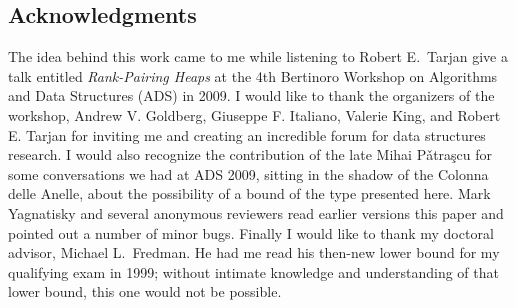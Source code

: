 \begin{fullonly}
\section{Acknowledgments}

The idea behind this work came to me while listening to Robert E.~Tarjan give a talk entitled \emph{Rank-Pairing Heaps} 
at the 4th Bertinoro Workshop on Algorithms and Data Structures (ADS) in 2009. I would like to thank the organizers of the workshop, Andrew V. Goldberg,
Giuseppe F. Italiano,  
Valerie King, and
Robert E. Tarjan for inviting me and creating an incredible forum for data structures research.
I would also recognize the contribution of the late Mihai P\v{a}tra\c{s}cu for some conversations we had at ADS 2009, sitting in the shadow of the Colonna delle Anelle, about the possibility of a bound of the type presented here.
Mark Yagnatisky and several anonymous reviewers read earlier versions this paper and pointed out a number of minor bugs. 
Finally I would like to thank my doctoral advisor, Michael L.~Fredman. He had me read his then-new lower bound for my qualifying exam in 1999; without intimate knowledge and understanding of that lower bound, this one would not be possible.
\end{fullonly}